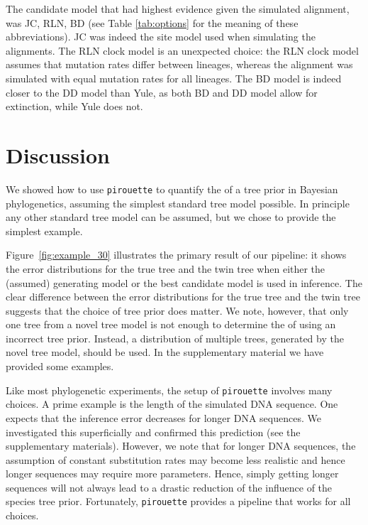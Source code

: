 The candidate model that had highest evidence given the simulated alignment,
was JC, RLN, BD (see Table \ref{tab:options} for the meaning of these 
abbreviations). JC was indeed the site model used when simulating the
alignments. The RLN clock model is an unexpected choice: the RLN clock
model assumes that mutation rates differ between lineages, whereas the
alignment was simulated with equal mutation rates for all lineages.
The BD model is indeed closer to the DD model than Yule, as both BD and DD
model allow for extinction, while Yule does not.

\section{Discussion}

We showed how to use \verb;pirouette; to quantify the  of a 
tree prior in Bayesian phylogenetics, assuming the simplest standard 
tree model possible.
In principle any other standard tree model can be assumed, 
but we chose to provide the simplest example.

Figure~\ref{fig:example_30} illustrates the primary result of our pipeline: 
it shows the error distributions for the true tree and the twin tree 
when either the (assumed) generating model or the best candidate model is used in inference. 
The clear difference between the error distributions 
for the true tree and the twin tree suggests 
that the choice of tree prior does matter.
We note, however, that only one tree from a novel tree model
is not enough to determine the  of using an incorrect
tree prior. Instead, a distribution 
of multiple trees, generated by the novel tree model, should be used. In the supplementary material we have provided some examples.

Like most phylogenetic experiments, the setup of \verb;pirouette;
involves many choices. A prime example is the
length of the simulated DNA sequence. One expects that the inference error
decreases for longer DNA sequences. We investigated this
superficially and confirmed this prediction (see the supplementary materials). 
However, we note that for longer DNA sequences, the assumption 
of constant substitution rates may become less realistic 
and hence longer sequences may require more parameters. 
Hence, simply getting longer sequences will not always lead to a drastic 
reduction of the influence of the species tree prior.
Fortunately, \verb;pirouette; provides a pipeline that works for all choices.


